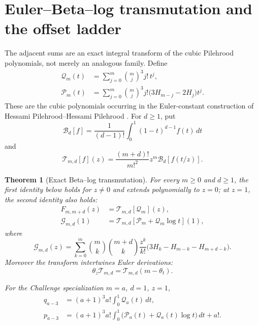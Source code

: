 \documentclass[11pt]{article}
\newtheorem{theorem}{Theorem}[section]
\theoremstyle{definition}
\theoremstyle{remark}
\begin{document}
\section{Euler--Beta--log transmutation and the offset ladder}
\label{sec:beta-log}

The adjacent sums are an exact integral transform of the cubic Pilehrood
polynomials, not merely an analogous family.  Define
\begin{align}
 \mathcal Q_m(t)&=\sum_{j=0}^m\binom mj^3j!\,t^j,
 \label{eq:cubic-Q}\\
 \mathcal P_m(t)&=\sum_{j=0}^m\binom mj^3j!
   \bigl(3H_{m-j}-2H_j\bigr)t^j.
 \label{eq:cubic-P}
\end{align}
These are the cubic polynomials occurring in the Euler-constant construction
of Hessami Pilehrood--Hessami Pilehrood
\cite{Pilehrood2013,PilehroodBell2012}.  For \(d\ge1\), put
\begin{equation}\label{eq:Beta-operator}
 \mathcal B_d[f]=\frac1{(d-1)!}\int_0^1(1-t)^{d-1}f(t)\,dt
\end{equation}
and
\begin{equation}\label{eq:transmutation-operator}
 \mathcal T_{m,d}[f](z)=
 \frac{(m+d)!}{m!^2}z^m\mathcal B_d[f(t/z)].
\end{equation}

\begin{theorem}[Exact Beta--log transmutation]
\label{thm:beta-log-transform}
For every \(m\ge0\) and \(d\ge1\), the first identity below holds for
\(z\ne0\) and extends polynomially to \(z=0\); at \(z=1\), the second
identity also holds:
\begin{align}
 F_{m,m+d}(z)&=\mathcal T_{m,d}[\mathcal Q_m](z),
 \label{eq:offset-F-transform}\\
 \mathcal G_{m,d}(1)&=
 \mathcal T_{m,d}[\mathcal P_m+\mathcal Q_m\log t](1),
 \label{eq:offset-G-transform}
\end{align}
where
\begin{equation}\label{eq:Gmd-def}
 \mathcal G_{m,d}(z)=
 \sum_{k=0}^m\binom mk\binom{m+d}k\frac{z^k}{k!}
 \bigl(3H_k-H_{m-k}-H_{m+d-k}\bigr).
\end{equation}
Moreover the transform intertwines Euler derivations:
\begin{equation}\label{eq:Beta-intertwining}
 \theta_z\mathcal T_{m,d}
 =\mathcal T_{m,d}(m-\theta_t).
\end{equation}

For the Challenge specialization \(m=a\), \(d=1\), \(z=1\),
\begin{align}
 q_{a-3}&=(a+1)^3a!\int_0^1\mathcal Q_a(t)\,dt,
 \label{eq:q-Beta-transform}\\
 p_{a-3}&=(a+1)^3a!
 \int_0^1\bigl(\mathcal P_a(t)+\mathcal Q_a(t)\log t\bigr)\,dt+a!.
 \label{eq:p-Beta-transform}
\end{align}
\end{theorem}
\end{document}
